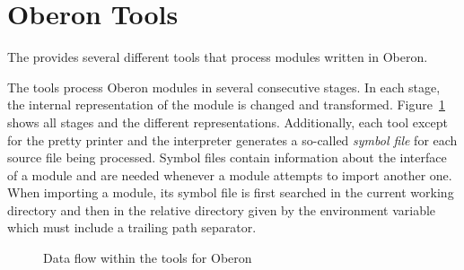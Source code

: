 \section{Oberon Tools}\label{sec:obtools}

The \ecs{} provides several different tools that process modules written in Oberon.
\interface\seeguide

The tools process Oberon modules in several consecutive stages.
In each stage, the internal representation of the module is changed and transformed.
Figure~\ref{fig:obdataflow} shows all stages and the different representations.
Additionally, each tool except for the pretty printer and the interpreter generates a so-called \emph{symbol file} for each source file being processed.
Symbol files contain information about the interface of a module and are needed whenever a module attempts to import another one.
When importing a module, its symbol file is first searched in the current working directory and then in the relative directory given by the  environment variable which must include a trailing path separator.

\begin{figure}
\caption{Data flow within the tools for Oberon}
\label{fig:obdataflow}
\end{figure}

